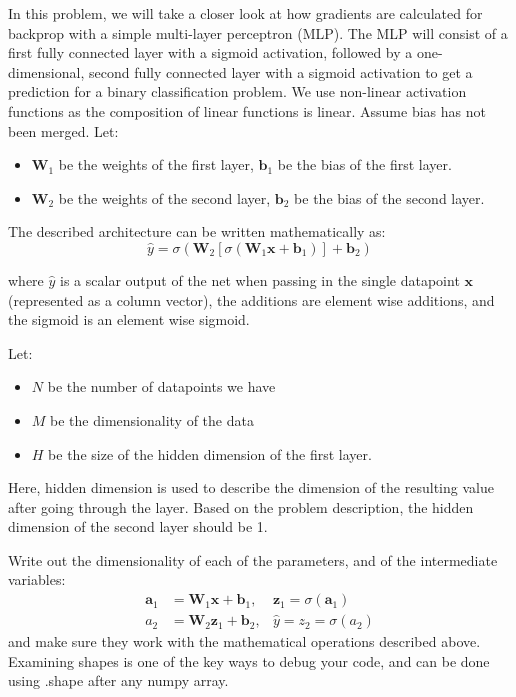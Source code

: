 \documentclass[expanded]{lkx_pset}
\begin{document}
\begin{solution}
	In this problem, we will take a closer look at how gradients are calculated for backprop with a simple multi-layer perceptron (MLP). The MLP will consist of a first fully connected layer with a sigmoid activation, followed by a one-dimensional, second fully connected layer with a sigmoid activation to get a prediction for a binary classification problem. We use non-linear activation functions as the composition of linear functions is linear. Assume bias has not been merged. Let:
	\begin{itemize}
		\item $\mathbf{W}_1$ be the weights of the first layer, $\mathbf{b}_1$ be the bias of the first layer.
		\item $\mathbf{W}_2$ be the weights of the second layer, $\mathbf{b}_2$ be the bias of the second layer.
	\end{itemize}

	The described architecture can be written mathematically as: $$\hat{y} = \sigma(\mathbf{W}_2 \left[\sigma \left(\mathbf{W}_1 \mathbf{x} + \mathbf{b}_1\right)\right] + \mathbf{b}_2)$$

	where $\hat{y}$ is a scalar output of the net when passing in the single datapoint $\mathbf{x}$ (represented as a column vector), the additions are element wise additions, and the sigmoid is an element wise sigmoid.

	\begin{part}{1}
		Let:
		\begin{itemize}
			\item $N$ be the number of datapoints we have
			\item $M$ be the dimensionality of the data
			\item $H$ be the size of the hidden dimension of the first layer.

		\end{itemize}
		Here, hidden dimension is used to describe the dimension of the resulting value after going through the layer. Based on the problem description, the hidden dimension of the second layer should be 1.
	\end{part}
	\begin{parts}
		\begin{part}{}
			Write out the dimensionality of each of the parameters, and of the intermediate variables:
			\begin{align*}
				\mathbf{a}_1 & = \mathbf{W}_1 \mathbf{x} + \mathbf{b}_1,
				             & \mathbf{z}_1 = \sigma(\mathbf{a}_1)         \\
				a_2          & = \mathbf{W}_2 \mathbf{z}_1 + \mathbf{b}_2,
				             & \hat{y} = z_2 = \sigma(a_2)
			\end{align*}
			and make sure they work with the mathematical operations described above. Examining shapes is one of the key ways to debug your code, and can be done using .shape after any numpy array.
		\end{part}


\end{parts}
\end{solution}
\end{document}
